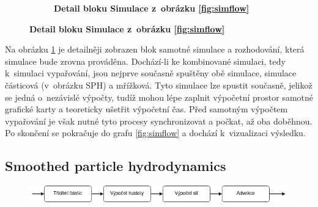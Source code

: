 \begin{figure}[h]
\begin{subfigure}[t]{.5\textwidth}
		\caption{\textbf{Detail bloku Simulace z~obrázku \ref{fig:simflow}}}
		\label{fig:simTypeflow}
	\end{subfigure}
	\label{fig:SimulationFlow}
\end{figure}

Na obrázku \ref{fig:simTypeflow} je detailněji zobrazen blok samotné simulace a rozhodování, která simulace bude zrovna prováděna. Dochází-li ke kombinované simulaci, tedy k~simulaci vypařování, jsou nejprve současně spuštěny obě simulace, simulace částicová (v~obrázku SPH) a mřížková. Tyto simulace lze spustit současně, jelikož se jedná o~nezávislé výpočty, tudíž mohou lépe zaplnit výpočetní prostor samotné grafické karty a teoreticky ušetřit výpočetní čas. Před samotným výpočtem vypařování je však nutné tyto procesy synchronizovat a počkat, až oba doběhnou. Po skončení se pokračuje do grafu \ref{fig:simflow} a dochází k~vizualizaci výsledku.


\subsection{Smoothed particle hydrodynamics}
\label{chapter:simSPH}

\begin{figure}[hb!]
	\centering
	\captionsetup{justification=centering}
	\includegraphics[scale=0.6]{obrazky-figures/SPH.png}
	\label{fig:SPHflow}
\end{figure}

